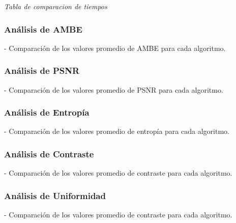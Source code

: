 \documentclass[sigchi]{acmart}
\begin{document}
\begin{table}[htbp]
	\caption{Comparación de tiempos de procesamiento}
	\label{tab:comparacion_tiempos}
	\small

	\vspace{0.5em}
	\footnotesize%
	\textit{Tabla de comparacion de tiempos}
\end{table}

\subsubsection{Análisis de AMBE}
\label{subsubsec:analisis_ambe}
- Comparación de los valores promedio de AMBE para cada algoritmo.

\subsubsection{Análisis de PSNR}
\label{subsubsec:analisis_psnr}
- Comparación de los valores promedio de PSNR para cada algoritmo.

\subsubsection{Análisis de Entropía}
\label{subsubsec:analisis_entropia}
- Comparación de los valores promedio de entropía para cada algoritmo.

\subsubsection{Análisis de Contraste}
\label{subsubsec:analisis_contraste}
- Comparación de los valores promedio de contraste para cada algoritmo.

\subsubsection{Análisis de Uniformidad}
\label{subsubsec:analisis_uniformidad}
- Comparación de los valores promedio de contraste para cada algoritmo.
\end{document}
